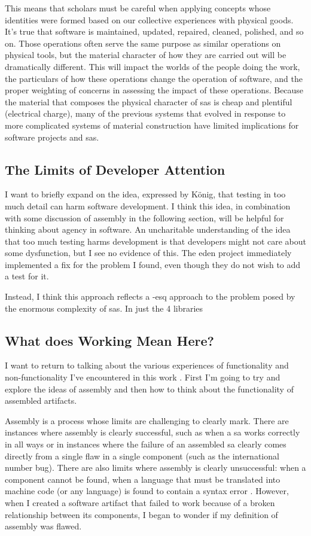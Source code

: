 \documentclass[a4paper,man,natbib,floatsintext]{apa6}
\begin{document}
   This means that scholars must be careful when applying concepts whose identities were formed based on our collective experiences with physical goods. It's true that software is maintained, updated, repaired, cleaned, polished, and so on. Those operations often serve the same purpose as similar operations on physical tools, but the material character of how they are carried out will be dramatically different. This will impact the worlds of the people doing the work, the particulars of how these operations change the operation of software, and the proper weighting of concerns in assessing the impact of these operations. Because the material that composes the physical character of \glspl{sa} is cheap and plentiful (electrical charge), many of the previous systems that evolved in response to more complicated systems of material construction have limited implications for software projects and \glspl{sa}.

   \subsection*{The Limits of Developer Attention}
   I want to briefly expand on the idea, expressed by K{\"o}nig, that testing in too much detail can harm software development. I think this idea, in combination with some discussion of assembly in the following section, will be helpful for thinking about agency in software. An uncharitable understanding of the idea that too much testing harms development is that developers might not care about some dysfunction, but I see no evidence of this. The \acrshort{eden} project immediately implemented a fix for the problem I found, even though they do not wish to add a test for it. 

   Instead, I think this approach reflects a \citet{Citton2017-xq}-esq approach to the problem posed by the enormous complexity of \glspl{sa}. In just the 4 libraries


   \subsection*{What does Working Mean Here?}
   I want to return to talking about the various experiences of functionality and non-functionality I've encountered in this work . First I'm going to try and explore the ideas of assembly and then how to think about the functionality of assembled artifacts.

   Assembly is a process whose limits are challenging to clearly mark. There are instances where assembly is clearly successful, such as when a \gls{sa} works correctly in all ways or in instances where the failure of an assembled \gls{sa} clearly comes directly from a single flaw in a single component (such as the international number bug). There are also limits where assembly is clearly unsuccessful: when a component cannot be found, when a language that must be translated into machine code (or any language) is found to contain a syntax error \citep{Cramer2008-cw}. However, when I created a software artifact that failed to work because of a broken relationship between its components, I began to wonder if my definition of assembly was flawed.
\end{document}
